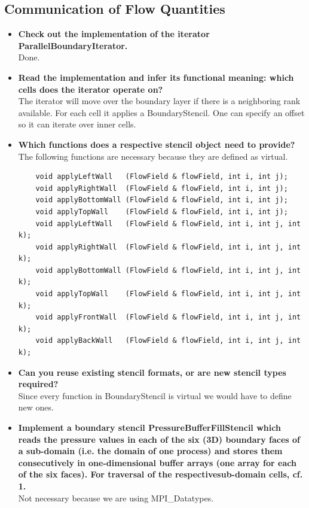 \documentclass[a4paper]{article}
\begin{document}
\subsection{Communication of Flow Quantities}
\begin{itemize}
	\item \textbf{Check out the implementation of the iterator ParallelBoundaryIterator.}\\
	Done.
	\item \textbf{Read the implementation and infer its functional meaning: which cells does the iterator operate on?}\\
	The iterator will move over the boundary layer if there is a neighboring rank available. For each cell it applies a BoundaryStencil. One can specify an offset so it can iterate over inner cells.
	\item \textbf{Which functions does a respective stencil object need to provide?}\\
	The following functions are necessary because they are defined as virtual.
	\begin{lstlisting}
	void applyLeftWall   (FlowField & flowField, int i, int j);
	void applyRightWall  (FlowField & flowField, int i, int j);
	void applyBottomWall (FlowField & flowField, int i, int j);
	void applyTopWall    (FlowField & flowField, int i, int j);
	void applyLeftWall   (FlowField & flowField, int i, int j, int k);
	void applyRightWall  (FlowField & flowField, int i, int j, int k);
	void applyBottomWall (FlowField & flowField, int i, int j, int k);
	void applyTopWall    (FlowField & flowField, int i, int j, int k);
	void applyFrontWall  (FlowField & flowField, int i, int j, int k);
	void applyBackWall   (FlowField & flowField, int i, int j, int k);
	\end{lstlisting}
	
	\item \textbf{Can you reuse existing stencil formats, or are new stencil types required?}\\
	Since every function in BoundaryStencil is virtual we would have to define new ones.
	
	\item \textbf{Implement a boundary stencil PressureBufferFillStencil which reads the pressure values in each of the six (3D) boundary faces of a sub-domain (i.e. the domain of one process) and stores them consecutively in one-dimensional buffer arrays (one array for each of the six faces). For traversal of the respectivesub-domain cells, cf. 1.}\\
	Not necessary because we are using MPI\_Datatypes.
	

\end{itemize}
\end{document}

